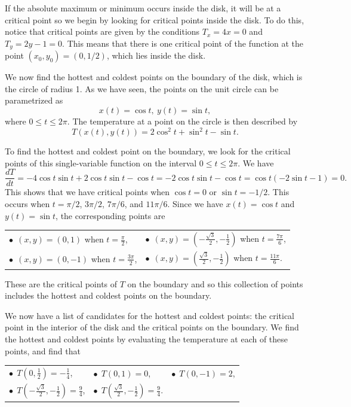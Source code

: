 \begin{example}
If the absolute maximum or minimum occurs inside the disk, it will be
at a critical point so we begin by looking for critical points inside
the disk.  To do this, notice that critical points are given by the
conditions $T_x= 4x=0$ and $T_y=2y - 1=0$.  This means that there is
one critical point of the function at the point $(x_0,y_0) =
(0,1/2)$, which lies inside the disk.

We now find the hottest and coldest points on the boundary of the
disk, which is the circle of radius 1.  As we have seen, the points on
the unit circle can be parametrized as
$$
x(t) = \cos t, \ y(t) = \sin t,
$$
where $0\leq t \leq 2\pi$.  The temperature at a point on the circle
is then described by
$$
T(x(t), y(t)) = 2\cos^2 t + \sin^2 t - \sin t.
$$

To find the hottest and coldest point on the boundary, we look for the
critical points of this single-variable function on the interval $0\leq t\leq 2\pi$.
We have
$$
\frac{dT}{dt} = -4\cos t\sin t + 2\cos t\sin t -\cos t = -2\cos t\sin
t - \cos t = \cos t (-2\sin t - 1) = 0.
$$
This shows that we have critical points when $\cos t = 0$ or $\sin t
= -1/2$.  This occurs when $t=\pi/2$, $3\pi/2$, $7\pi/6$, and
$11\pi/6$.  Since we have $x(t) = \cos t$ and $y(t) = \sin t$, the corresponding
points are 
\begin{center}
  \begin{tabular}{ll}
    $\bullet\ \ (x,y) = (0,1)$ when $t = \frac{\pi}{2}$, &
    $\bullet\ \ (x,y) = \left(-\frac{\sqrt{3}}{2},-\frac{1}{2}\right)$ when $t
    = \frac{7\pi}{6}$, \\
    $\bullet\ \ (x,y) = (0,-1)$ when $t = \frac{3\pi}{2}$,\hspace*{20pt} &
    $\bullet\ \ (x,y) = \left(\frac{\sqrt{3}}{2},-\frac{1}{2}\right)$ when $t =
    \frac{11\pi}{6}$. \hspace*{20pt}
    \end{tabular}
\end{center}
These are the critical points of $T$ on the boundary and so this
collection of points includes the hottest and coldest points on the
boundary. 

We now have a list of candidates for the hottest and coldest points:
the critical point in the interior of the disk and the critical points
on the boundary.  We find the hottest and coldest points by evaluating
the temperature at each of these points, and find that

\begin{center}
  \begin{tabular}{lll}
    $\bullet\ \  T\left(0,\frac{1}{2}\right) = -\frac{1}{4}$, \hspace*{20pt} &
    $\bullet\ \  T\left(0,1\right) = 0$, \hspace*{20pt} &
    $\bullet\ \  T\left(0,-1\right) = 2$, \\
    $\bullet\ \  T\left(-\frac{\sqrt{3}}{2},-\frac{1}{2}\right) =
    \frac{9}{4}$, \hspace*{20pt} &
    $\bullet\ \  T\left(\frac{\sqrt{3}}{2},-\frac{1}{2}\right) =
    \frac{9}{4}$. \hspace*{20pt} &
  \end{tabular}
\end{center}


\end{example}
